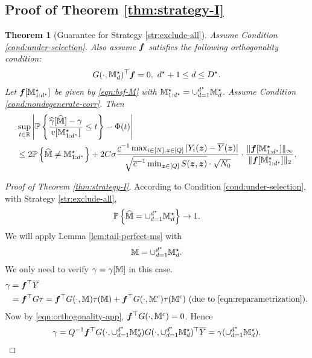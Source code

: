 \documentclass[12pt]{article}
\newtheorem{theorem}{Theorem}
\begin{document}
\subsection{Proof of Theorem \ref{thm:strategy-I}}
\begin{theorem}[Guarantee for Strategy \ref{str:exclude-all}]
Assume Condition \ref{cond:under-selection}. Also assume ${\boldsymbol{f}}$ satisfies the following orthogonality condition: 
\begin{align}\label{eqn:orthogonality-app}
    G(\cdot, {\mathbb{M}}_d^{\star})^\top{\boldsymbol{f}} = 0, ~d^\star +1 \le d \le D^\star.
\end{align}
Let $ {{\boldsymbol{f}}}[{\mathbb{M}}^\star_{1:d^\star}]$ be given by \eqref{eqn:bsf-M} with ${\mathbb{M}}^\star_{1:d^\star} = \cup_{d=1}^{d^\star}{\mathbb{M}}^\star_d$. Assume Condition \ref{cond:nondegenerate-corr}. 
Then
\begin{align}\label{eqn:tail-under-ms-app}
    &\sup_{t\in{\mathbb{R}}}\left|{{\mathbb{P}}\left\{\frac{{\widehat{\gamma}}[\widehat{{\mathbb{M}}}]-\gamma}{v[{\mathbb{M}}^\star_{1:d^\star}]} \le t\right\}} - \Phi(t)\right| \notag\\
    &\le 2{{\mathbb{P}}\left\{\widehat{{\mathbb{M}}}\neq {\mathbb{M}}^\star_{1:d^\star}\right\}} +  2C\sigma  \frac{\underline{c}^{-1} \max_{i\in[N],{\boldsymbol{z}}\in[Q]}|Y_i({\boldsymbol{z}})-\overline{Y}({\boldsymbol{z}})|}{\sqrt{\overline{c}^{-1} \min_{{\boldsymbol{z}}\in[Q]} S({\boldsymbol{z}},{\boldsymbol{z}})}\cdot \sqrt{N_0}}\cdot  \frac{\|{{\boldsymbol{f}}}[{\mathbb{M}}^\star_{1:d^\star}]\|_\infty}{\|{{\boldsymbol{f}}}[{\mathbb{M}}^\star_{1:d^\star}]\|_2} .
\end{align}
\end{theorem}
\begin{proof}[Proof of Theorem \ref{thm:strategy-I}]
According to Condition \ref{cond:under-selection}, with Strategy \ref{str:exclude-all}, 
\begin{align*}
    {{\mathbb{P}}\left\{\widehat{{\mathbb{M}}} = \cup_{d=1}^{d^\star}{\mathbb{M}}^\star_d\right\}} \to 1. 
\end{align*}
We will apply Lemma \ref{lem:tail-perfect-ms} with 
\begin{align*}
{\mathbb{M}} = \cup_{d=1}^{d^\star}{\mathbb{M}}_d^\star.
\end{align*}
We only need to verify $\gamma = \gamma[{\mathbb{M}}]$ in this case.
\begin{align*}
    \gamma &= {\boldsymbol{f}}^\top \overline{Y}\\
    &= {\boldsymbol{f}}^\top G\tau ={\boldsymbol{f}}^\top G(\cdot, {\mathbb{M}})\tau({\mathbb{M}}) + {\boldsymbol{f}}^\top G(\cdot, {\mathbb{M}}^c)\tau({\mathbb{M}}^c) \text{ (due to \eqref{eqn:reparametrization})}.
\end{align*}
Now by \eqref{eqn:orthogonality-app}, ${\boldsymbol{f}}^\top G(\cdot, {\mathbb{M}}^c) = 0$. Hence
\begin{align*}
    \gamma = Q^{-1}{\boldsymbol{f}}^\top G(\cdot, \cup_{d=1}^{d^\star}{\mathbb{M}}_d^\star)G(\cdot,\cup_{d=1}^{d^\star}{\mathbb{M}}_d^\star)^\top \overline{Y} = \gamma(\cup_{d=1}^{d^\star}{\mathbb{M}}_d^\star).
\end{align*}
\end{proof}
\end{document}
